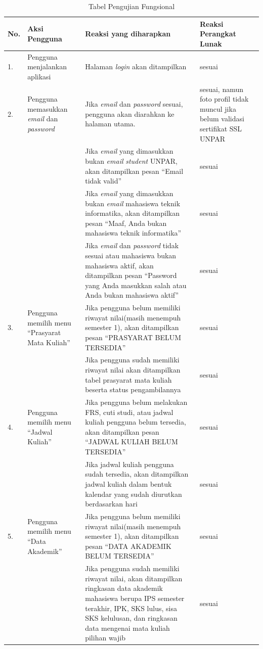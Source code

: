 			\begin{table}[H]
			\centering
			\caption{Tabel Pengujian Fungsional}
				\begin{tabular}{|p{0.5cm}| p{3.5cm}| p{7cm}| p{2.25cm}|} \hline
				No.	&	Aksi Pengguna	&	Reaksi yang diharapkan	&	Reaksi Perangkat Lunak \\ \hline
				1.	&	Pengguna menjalankan aplikasi	&	Halaman \textit{login} akan ditampilkan	&	sesuai	\\ \hline
				2.	&	Pengguna memasukkan \textit{email} dan \textit{password}	&	Jika \textit{email} dan \textit{password}	sesuai, pengguna akan diarahkan ke halaman utama. & sesuai, namun foto profil tidak muncul jika belum validasi sertifikat SSL UNPAR\\ \hline
					&	&	Jika \textit{email} yang dimasukkan bukan \textit{email} \textit{student} UNPAR, akan ditampilkan pesan ``Email tidak valid''&	sesuai	\\ \hline
					&	&	Jika \textit{email} yang dimasukkan bukan \textit{email} mahasiswa teknik informatika, akan ditampilkan pesan ``Maaf, Anda bukan mahasiswa teknik informatika''	&	sesuai	\\ \hline
					&	&	Jika \textit{email} dan \textit{password} tidak sesuai atau mahasiswa bukan mahasiswa aktif, akan ditampilkan pesan ``Password yang Anda masukkan salah atau Anda bukan mahasiswa aktif''	&	sesuai	\\ \hline
				3.	&	Pengguna memilih menu ``Prasyarat Mata Kuliah'' &	Jika pengguna belum memiliki riwayat nilai(masih menempuh semester 1), akan ditampilkan pesan ``PRASYARAT BELUM TERSEDIA''	&	sesuai	\\ \hline
					&	&	Jika pengguna sudah memiliki riwayat nilai	akan ditampilkan tabel prasyarat mata kuliah beserta status pengambilannya &	sesuai	\\ \hline
				4.	&	Pengguna memilih menu ``Jadwal Kuliah'' &	Jika pengguna belum melakukan FRS, cuti studi, atau jadwal kuliah pengguna belum tersedia, akan ditampilkan pesan ``JADWAL KULIAH BELUM TERSEDIA''	&	sesuai	\\ \hline
					&	&	Jika jadwal kuliah pengguna sudah tersedia, akan ditampilkan jadwal kuliah dalam bentuk kalendar yang sudah diurutkan berdasarkan hari &	sesuai	\\ \hline
				5.	&	Pengguna memilih menu ``Data Akademik'' &	Jika pengguna belum memiliki riwayat nilai(masih menempuh semester 1), akan ditampilkan pesan ``DATA AKADEMIK BELUM TERSEDIA'' &	sesuai	\\ \hline
					&	&	Jika pengguna sudah memiliki riwayat nilai, akan ditampilkan ringkasan data akademik mahasiswa berupa IPS semester terakhir, IPK, SKS lulus, sisa SKS kelulusan, dan ringkasan data mengenai mata kuliah pilihan wajib &	sesuai	\\ \hline

\end{tabular}
\end{table}
